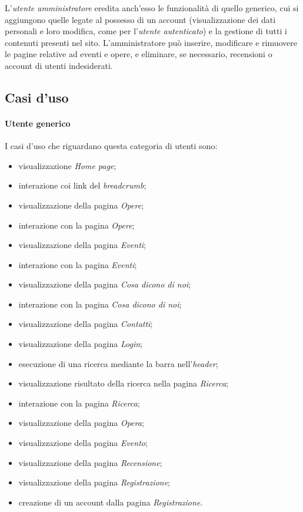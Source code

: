 L'\textit{utente amministratore} eredita anch'esso le funzionalità di quello generico, cui si aggiungono quelle legate al possesso di un account (visualizzazione dei dati personali e loro modifica, come per l'\textit{utente autenticato}) e  la gestione di tutti i contenuti presenti nel sito. L'amministratore può inserire, modificare e rimuovere le pagine relative ad eventi e opere, e eliminare, se necessario, recensioni o account di utenti indesiderati.


\subsection{Casi d'uso}
\label{analisi-casi-uso}

\paragraph{Utente generico}
\label{analisi-casi-uso-attori-principali-utente-generico}
I casi d'uso che riguardano questa categoria di utenti sono:
\begin{itemize}
	\item visualizzazione \textit{Home page};
	\item interazione coi link del \textit{breadcrumb};
	\item visualizzazione della pagina \textit{Opere};
	\item interazione con la pagina \textit{Opere};
	\item visualizzazione della pagina \textit{Eventi};
	\item interazione con la pagina \textit{Eventi};
	\item visualizzazione della pagina \textit{Cosa dicono di noi};
	\item interazione con la pagina \textit{Cosa dicono di noi};
	\item visualizzazione della pagina \textit{Contatti};
	\item visualizzazione della pagina \textit{Login};
	\item esecuzione di una ricerca mediante la barra nell'\textit{header};
	\item visualizzazione risultato della ricerca nella pagina \textit{Ricerca};
	\item interazione con la pagina \textit{Ricerca};
	\item visualizzazione della pagina \textit{Opera};
	\item visualizzazione della pagina \textit{Evento};
	\item visualizzazione della pagina \textit{Recensione};
	\item visualizzazione della pagina \textit{Registrazione};
	\item creazione di un account dalla pagina \textit{Registrazione}.
\end{itemize}

